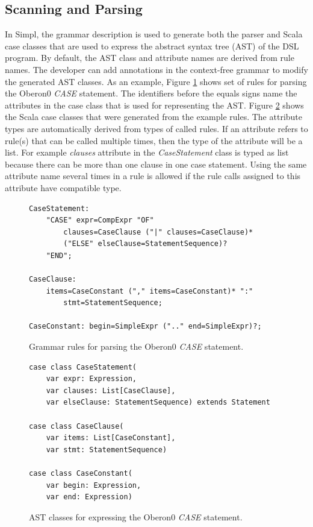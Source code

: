 \subsection{Scanning and Parsing}

In Simpl, the grammar description is used to generate both the parser
and Scala case classes that are used to express the abstract syntax
tree (AST) of the DSL program. By default, the AST class and attribute
names are derived from rule names. The developer can add annotations
in the context-free grammar to modify the generated AST classes. As
an example, Figure \ref{fig:case-statement} shows set of rules for
parsing the Oberon0 \emph{CASE} statement. The identifiers before
the equals signs name the attributes in the case class that is used
for representing the AST. Figure \ref{fig:Automatically-generated-AST}
shows the Scala case classes that were generated from the example
rules. The attribute types are automatically derived from types of
called rules. If an attribute refers to rule(s) that can be called
multiple times, then the type of the attribute will be a list. For
example \emph{clauses} attribute in the \emph{CaseStatement} class
is typed as list because there can be more than one clause in one
case statement. Using the same attribute name several times in a rule
is allowed if the rule calls assigned to this attribute have compatible
type.

%
\begin{figure}[!h]
{\small }
\begin{lstlisting}[basicstyle={\footnotesize\ttfamily}]
CaseStatement:
    "CASE" expr=CompExpr "OF"
        clauses=CaseClause ("|" clauses=CaseClause)*
        ("ELSE" elseClause=StatementSequence)?
    "END";

CaseClause:
    items=CaseConstant ("," items=CaseConstant)* ":"
        stmt=StatementSequence;

CaseConstant: begin=SimpleExpr (".." end=SimpleExpr)?;
\end{lstlisting}
{\small \par}

\caption{\label{fig:case-statement}Grammar rules for parsing the Oberon0 \emph{CASE}
statement.}

\end{figure}


%
\begin{figure}[!h]
{\small }
\begin{lstlisting}[basicstyle={\footnotesize\ttfamily}]
case class CaseStatement(
    var expr: Expression, 
    var clauses: List[CaseClause], 
    var elseClause: StatementSequence) extends Statement

case class CaseClause(
    var items: List[CaseConstant],
    var stmt: StatementSequence)

case class CaseConstant(
    var begin: Expression, 
    var end: Expression)
\end{lstlisting}
{\small \par}

\caption{\label{fig:Automatically-generated-AST}AST classes for expressing
the Oberon0 \emph{CASE }statement.}

\end{figure}


